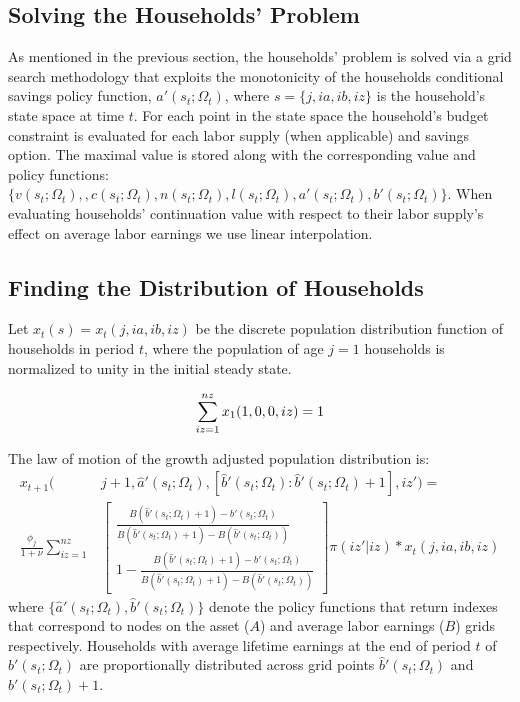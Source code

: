 \documentclass[11pt,leqno,fleqn]{article}
\newcommand{\be}{\vspace{-1em}\begin{singlespace}\begin{equation}}
\newcommand{\ee}{\end{equation}\end{singlespace}}
\begin{document}
\subsection{Solving the Households' Problem} \label{HHsolve}

As mentioned in the previous section, the households' problem is solved via a grid search methodology that exploits the monotonicity of the households conditional savings policy function, $a'(s_t;\Omega_t)$, where $s = \{j,ia,ib,iz\}$ is the household's state space at time $t$. For each point in the state space the household's budget constraint is evaluated for each labor supply (when applicable) and savings option. The maximal value is stored along with the corresponding value and policy functions:\\
$\{v(s_t;\Omega_t),,c(s_t;\Omega_t),n(s_t;\Omega_t),l(s_t;\Omega_t),a'(s_t;\Omega_t),b'(s_t;\Omega_t)\}$. When evaluating households' continuation value with respect to their labor supply's effect on average labor earnings we use linear interpolation.

\subsection{Finding the Distribution of Households}

Let $x_t(s) = x_t(j,ia,ib,iz)$ be the discrete population distribution function of households in period $t$, where the population of age $j=1$ households is normalized to unity in the initial steady state.
\be \sum_{iz=1}^{nz} x_1(1,0,0,iz) = 1 \notag \ee

The law of motion of the growth adjusted population distribution is:
\begin{align*}
x_{t+1}(&j+1,\hat{a}'(s_t;\Omega_t),[\hat{b}'(s_t;\Omega_t):\hat{b}'(s_t;\Omega_t)+1],iz') =\\
\frac{\phi_j}{1+\nu} \sum_{iz=1}^{nz}
&\begin{bmatrix}
\frac{B(\hat{b}'(s_t;\Omega_t)+1)-b'(s_t;\Omega_t)}{B(\hat{b}'(s_t;\Omega_t)+1)-B(\hat{b}'(s_t;\Omega_t))}\\
1-\frac{B(\hat{b}'(s_t;\Omega_t)+1)-b'(s_t;\Omega_t)}{B(\hat{b}'(s_t;\Omega_t)+1)-B(\hat{b}'(s_t;\Omega_t))}
\end{bmatrix}  \pi(iz'|iz)*x_{t}(j,ia,ib,iz)
\end{align*}
where $\{\hat{a}'(s_t;\Omega_t),\hat{b}'(s_t;\Omega_t)\}$ denote the policy functions that return indexes that correspond to nodes on the asset ($A$) and average labor earnings ($B$) grids respectively. Households with average lifetime earnings at the end of period $t$ of $b'(s_t;\Omega_t)$ are proportionally distributed across grid points $\hat{b}'(s_t;\Omega_t)$ and $\hat{b}'(s_t;\Omega_t)+1$.
\end{document}
